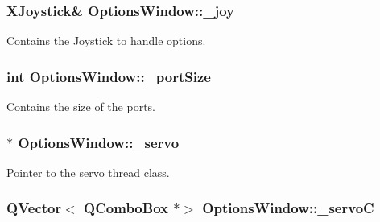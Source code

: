 \subsubsection[{\+\_\+joy}]{\setlength{\rightskip}{0pt plus 5cm}X\+Joystick\& Options\+Window\+::\+\_\+joy\hspace{0.3cm}{\ttfamily [private]}}\label{a00006_a1bf846ab681ab245f70adac30999947c}


Contains the Joystick to handle options. 

\hypertarget{a00006_a9bd4dccc7a544b1db78dc8cf330b88f6}{}
\subsubsection[{\+\_\+port\+Size}]{\setlength{\rightskip}{0pt plus 5cm}int Options\+Window\+::\+\_\+port\+Size\hspace{0.3cm}{\ttfamily [private]}}\label{a00006_a9bd4dccc7a544b1db78dc8cf330b88f6}


Contains the size of the ports. 

\hypertarget{a00006_acba1566fea3f831000d5e1c1edc3e776}{}
\subsubsection[{\+\_\+servo}]{$\ast$ Options\+Window\+::\+\_\+servo\hspace{0.3cm}{\ttfamily [private]}}\label{a00006_acba1566fea3f831000d5e1c1edc3e776}


Pointer to the servo thread class. 

\hypertarget{a00006_a45137fbf71bbee10e171019c913b88b7}{}
\subsubsection[{\+\_\+servo\+C}]{\setlength{\rightskip}{0pt plus 5cm}Q\+Vector$<$ Q\+Combo\+Box $\ast$$>$ Options\+Window\+::\+\_\+servo\+C\hspace{0.3cm}{\ttfamily [private]}}\label{a00006_a45137fbf71bbee10e171019c913b88b7}


